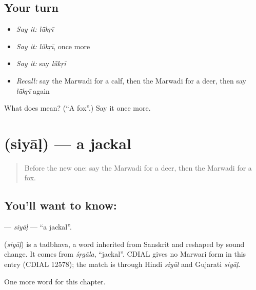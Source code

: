 \subsection*{Your turn}
\begin{itemize}
\raggedright
  \item \emph{Say it:} \emph{lū̃kṛī}
  \item \emph{Say it:} \emph{lū̃kṛī}, once more
  \item \emph{Say it:} say \emph{lū̃kṛī}
  \item \emph{Recall:} say the Marwadi for a calf, then the Marwadi for a deer, then say \emph{lū̃kṛī} again
\end{itemize}

\begin{tcolorbox}[breakable,colback=teal!4,colframe=teal!35!black,title={Before you move on}]
What does  mean? (\textquotedblleft{}A fox\textquotedblright{}.) Say it once more.
\end{tcolorbox}
\section[\texorpdfstring{\mw{सियाळ} (siyāḷ)}{सियाळ (siyāḷ)}]{ (siyāḷ) — a jackal}

\label{lesson:MW-C138-siyal}



\begin{quote}
Before the new one: say the Marwadi for a deer, then the Marwadi for a fox.
\end{quote}

\subsection*{You'll want to know: }
\textbf{} — \emph{siyāḷ} — \textquotedblleft{}a jackal\textquotedblright{}.

\begin{cousinweb}
\textbf{} (\emph{siyāḷ}) is a tadbhava, a word inherited from Sanskrit and reshaped by sound change. It comes from \emph{śṛgāla}, \textquotedblleft{}jackal\textquotedblright{}. CDIAL gives no Marwari form in this entry (CDIAL 12578); the match is through Hindi \emph{siyāl} and Gujarati \emph{siyāḷ}.
\end{cousinweb}

\begin{grammarlens}[title={What you've built}]
One more word for this chapter.
\end{grammarlens}

